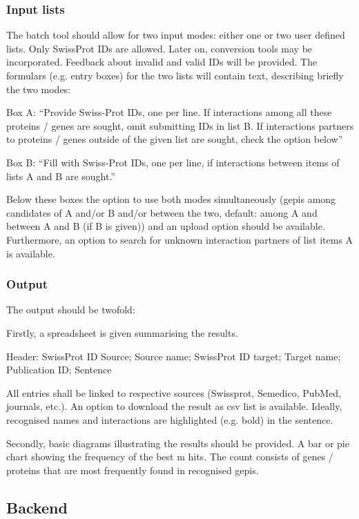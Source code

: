 \documentclass[a4paper,10pt]{article}
\begin{document}
\subsubsection{Input lists}
The batch tool should allow for two input modes: either one or two user defined lists. Only SwissProt IDs are allowed. Later on, conversion tools may be incorporated. Feedback about invalid and valid IDs will be provided.
The formulars (e.g. entry boxes) for the two lists will contain text, describing briefly the two modes:

Box A: ``Provide Swiss-Prot IDs, one per line. If interactions among all these proteins / genes are sought, omit submitting IDs in list B. If interactions partners to proteins / genes outside of the given list are sought, check the option below''

Box B: ``Fill with Swiss-Prot IDs, one per line, if interactions between items of lists A and B are sought.''

Below these boxes the option to use both modes simultaneously (gepis among candidates of A and/or B and/or between the two, default: among A and between A and B (if B is given)) and an upload option should be available. Furthermore, an option to search for unknown interaction partners of list items A is available.

\subsubsection{Output}
The output should be twofold:

Firstly, a spreadsheet is given summarising the results.

Header: SwissProt ID Source; Source name; SwissProt ID target; Target name; Publication ID; Sentence

All entries shall be linked to respective sources (Swissprot, Semedico, Pub\-Med, journals, etc.).
An option to download the result as csv list is available.
Ideally, recognised names and interactions are highlighted (e.g. bold) in the sentence. 

Secondly, basic diagrams illustrating the results should be provided. A bar or pie chart showing the frequency of the best m hits. The count consists of genes / proteins that are most frequently found in recognised gepis.

\subsection{Backend}
\end{document}
